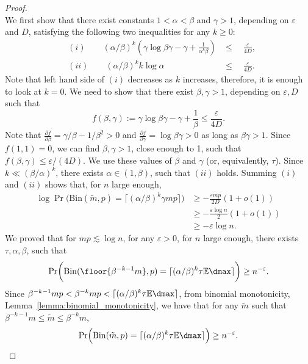 \begin{proof}
\begin{equation*}
\end{equation*}
We first show that there exist constants \(1 < \alpha < \beta\) and \(\gamma > 1\), depending on \(\varepsilon\) and \(D\), satisfying the following two inequalities for any \(k \geq 0\):
\begin{equation*}
    \begin{aligned}
        &(i) \qquad (\alpha/\beta)^k \left(\gamma \log \beta \gamma - \gamma + \frac{1}{\alpha^k \beta}\right) &\leq \quad \frac{\varepsilon}{4D}, \\
        &(ii) \qquad (\alpha/\beta)^k k \log \alpha & \leq \quad \frac{\varepsilon}{4D}.
    \end{aligned}
\end{equation*}
Note that left hand side of \((i)\) decreases as \(k\) increases, therefore, it is enough to look at \(k = 0\). We need to show that there exist \(\beta, \gamma > 1\), depending on \(\varepsilon, D\) such that
\begin{equation*}
    f(\beta, \gamma) := \gamma \log \beta \gamma - \gamma + \frac{1}{\beta} \leq \frac{\varepsilon}{4D}.
\end{equation*}
Note that \(\frac{\partial f}{\partial \beta} = \gamma / \beta - 1 / \beta^2 > 0\) and \(\frac{\partial f}{\partial \gamma} = \log \beta \gamma > 0\) as long as \(\beta \gamma > 1\). Since \(f(1, 1) = 0\), we can find \(\beta, \gamma > 1\), close enough to 1, such that \(f(\beta, \gamma) \leq \varepsilon / (4D)\).
We use these values of \(\beta\) and \(\gamma\) (or, equivalently, \(\tau\)). Since \(k \ll (\beta / \alpha)^k\), there exists \(\alpha \in (1, \beta)\), such that \((ii)\) holds. Summing \((i)\) and \((ii)\) shows that, for \(n\) large enough,
\begin{equation*}
\begin{aligned}
    \log \Pr\biggl(\mathrm{Bin}(\tilde m, p) = \bigl\lceil (\alpha / \beta)^k \gamma mp\bigr\rceil \biggr) &\geq - \frac{\varepsilon mp}{2D}(1 + o(1)) \\
    & \geq - \frac{\varepsilon \log n}{2} (1+o(1)) \\
    & \geq -\varepsilon \log n.
\end{aligned}
\end{equation*}
    We proved that for \(mp \lesssim \log n\), for any \(\varepsilon > 0\), for \(n\) large enough, there exists \(\tau, \alpha, \beta\), such that
       \begin{equation*}
        \mathrm{Pr}\biggl(\mathrm{Bin}(\floor {\beta^{-k-1} m}, p) = \lceil(\alpha/\beta)^k \tau \mathbb{E}\dmax\rceil \biggr) \geq n^{-\varepsilon}.
    \end{equation*}
    Since \(\beta^{-k-1}mp < \beta^{-k}mp < \lceil(\alpha/\beta)^k \tau \mathbb{E}\dmax\rceil\), from binomial monotonicity, Lemma~\ref{lemma:binomial_monotonicity}, we have that for any \(\tilde m\) such that \(\beta^{-k - 1} m \leq \tilde m \leq \beta^{-k} m\),
    \begin{equation*}
    \Pr\Bigl(\mathrm{Bin}(\tilde m, p) = \lceil(\alpha / \beta)^k \tau \mathbb{E}\dmax\rceil \Bigr) \geq n^{-\varepsilon}.
    \end{equation*}

\end{proof}
